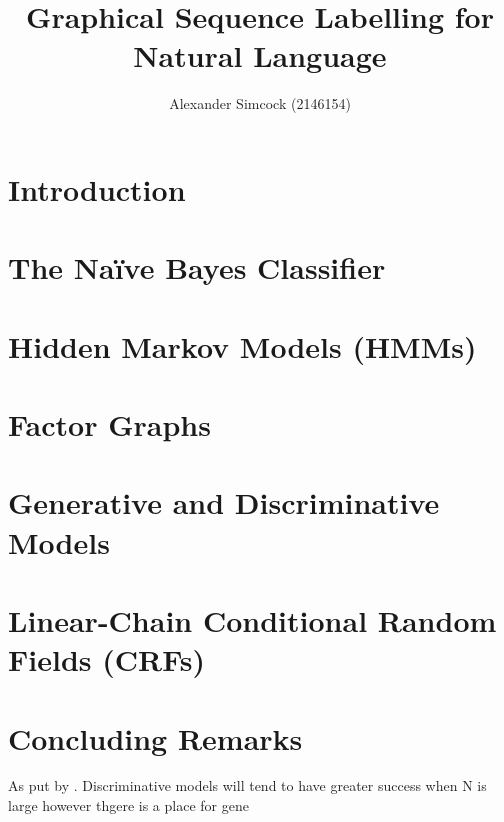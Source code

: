\documentclass[12pt]{article}
\title{Graphical Sequence Labelling for Natural Language}
\author{Alexander Simcock (2146154)}
\date{}
\begin{document}





\maketitle

\section{Introduction}


\section{The Na{\"i}ve Bayes Classifier}


\section{Hidden Markov Models (HMMs)}


\section{Factor Graphs}


\section{Generative and Discriminative Models}


\section{Linear-Chain Conditional Random Fields (CRFs)}


\section{Concluding Remarks}

As put by \autocite{andrew-generative-discriminative-2001}. Discriminative models will tend to have greater success when N is large however thgere is a place for gene

\printbibliography
\end{document}
